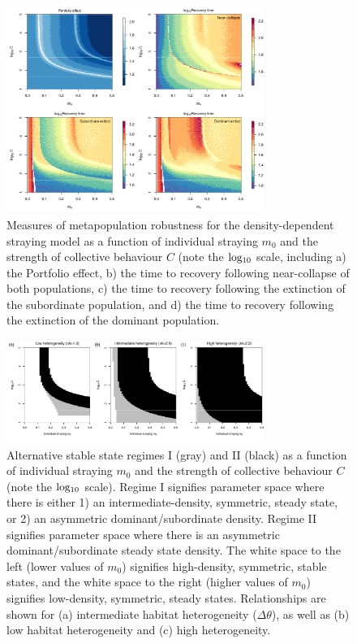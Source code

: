\documentclass{revtex4}
\begin{document}
\begin{figure}
  \captionsetup{justification=raggedright,
singlelinecheck=false
}
\centering
\includegraphics[width=0.75\textwidth]{fig_rtpe_ddm.pdf}
\caption{
Measures of metapopulation robustness for the density-dependent straying model as a function of individual straying $m_0$ and the strength of collective behaviour $C$ (note the $\rm log_{10}$ scale, including 
a) the Portfolio effect,
b) the time to recovery following near-collapse of both populations,
c) the time to recovery following the extinction of the subordinate population, and
d) the time to recovery following the extinction of the dominant population.
} \label{fig:pert}
\end{figure}



\begin{figure}
  \captionsetup{justification=raggedright,
singlelinecheck=false
}
\centering
\includegraphics[width=0.75\textwidth]{fig_hysteresis_ddm.pdf}
\caption{
Alternative stable state regimes I (gray) and II (black) as a function of individual straying $m_0$ and the strength of collective behaviour $C$ (note the $\rm log_{10}$ scale).
Regime I signifies parameter space where there is either 1) an intermediate-density, symmetric, steady state, or 2) an asymmetric dominant/subordinate density.
Regime II signifies parameter space where there is an asymmetric dominant/subordinate steady state density.
The white space to the left (lower values of $m_0$) signifies high-density, symmetric, stable states, and the white space to the right (higher values of $m_0$) signifies low-density, symmetric, steady states.
Relationships are shown for (a) intermediate habitat heterogeneity ($\Delta\theta$), as well as (b) low habitat heterogeneity and (c) high heterogeneity.
} \label{fig:bifurcationsddm}
\end{figure}
\end{document}

